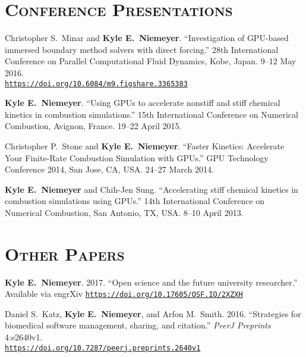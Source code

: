 \documentclass[margin,line,11pt]{res}
\makeatletter
\newlength{\bibhang}
\newlength{\bibsep}
 {\@listi \global\bibsep\itemsep \global\advance\bibsep by\parsep}
\newenvironment{bibenum*}
  {\renewcommand\labelenumi{\theenumi.}%
   \etaremune[
     topsep=0pt,
     itemsep=\bibsep,
     parsep=0pt,partopsep=0pt,
     itemindent=-\bibhang,
     leftmargin={\bibhang+\widthof{[999]}}]}
  {\endetaremune}
\newcommand*{\doi}[1]{\href{https://doi.org/#1}{\nolinkurl{https://doi.org/#1}}}
\makeatother
\begin{document}
\begin{resume}
\section{\textsc{Conference Presentations}}

\begin{bibenum*}

\item Christopher S.\ Minar and \textbf{Kyle E.\ Niemeyer}. ``Investigation of GPU-based immersed boundary method solvers with direct forcing.''
28th International Conference on Parallel Computational Fluid Dynamics, Kobe, Japan.
9--12 May 2016. \\
\doi{10.6084/m9.figshare.3365383}

\item \textbf{Kyle E.\ Niemeyer}.
``Using GPUs to accelerate nonstiff and stiff chemical kinetics in combustion simulations.''
15th International Conference on Numerical Combustion, Avignon, France.
19--22 April 2015.

\item Christopher P.\ Stone and \textbf{Kyle E.\ Niemeyer}.
``Faster Kinetics: Accelerate Your Finite-Rate Combustion Simulation with GPUs.''
GPU Technology Conference 2014, San Jose, CA, USA.
24--27 March 2014.

\item \textbf{Kyle E.\ Niemeyer} and Chih-Jen Sung.
``Accelerating stiff chemical kinetics in combustion simulations using GPUs.''
14th International Conference on Numerical Combustion, San Antonio, TX, USA.
8--10 April 2013.

\end{bibenum*}

\section{\textsc{Other Papers}}

\begin{bibenum*}

\item \textbf{Kyle E.\ Niemeyer}.
2017.
``Open science and the future university researcher.''
Available via engrXiv \doi{10.17605/OSF.IO/2XZXH}

\item Daniel S.\ Katz, \textbf{Kyle E.\ Niemeyer}, and Arfon M.\ Smith.
2016.
``Strategies for biomedical software management, sharing, and citation.''
\textit{PeerJ Preprints} 4:e2640v1. \\
\doi{10.7287/peerj.preprints.2640v1}


\end{bibenum*}
\end{resume}
\end{document}
